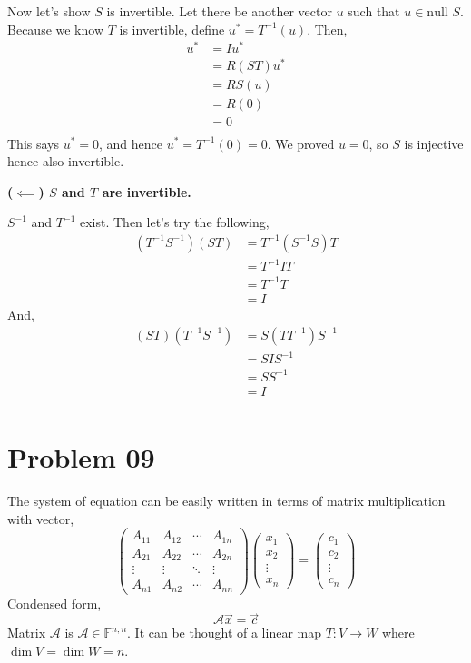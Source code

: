 \documentclass[letter]{article}
\begin{document}
Now let's show $S$ is invertible. Let there be another vector $u$ such that $u \in \text{null }S$. Because we know $T$ is invertible, define $u^{*} = T^{-1}(u)$. Then, 
\begin{align*}
	u^{*} &= I u^{*} \\ 
	&= R(ST)u^{*} \\
	&= RS(u) \\
	&= R(0) \\
	&= 0 \\
\end{align*}
This says $u^{*} = 0$, and hence $u^{*} = T^{-1}(0) = 0$. We proved $u=0$, so $S$ is injective hence also invertible. 

\textbf{
	($\impliedby$) $S$ and $T$ are invertible. 
}

$S^{-1}$ and $T^{-1}$ exist. Then let's try the following, 
\begin{align*}
	(T^{-1} S^{-1}) (ST) &= T^{-1} (S^{-1} S) T \\
	&= T^{-1} IT \\
	&= T^{-1} T \\
	&= I 
	\end{align*}
	And, 
	\begin{align*}
		(ST) (T^{-1} S^{-1}) &= S(T T^{-1})S^{-1}  \\ 
		&= S I S^{-1} \\
		&= S S^{-1} \\
		&= I \\
	\end{align*}


	\section*{Problem 09}
	The system of equation can be easily written in terms of matrix multiplication with vector, 
	\[
		\begin{pmatrix} A_{11} & A_{12} & \cdots & A_{1n} \\ 
			A_{21} & A_{22} & \cdots &A_{2n} \\ 
	\vdots & \vdots &\ddots & \vdots \\ 
A_{n1} & A_{n2} & \cdots & A_{n n }\end{pmatrix}  
\begin{pmatrix} x_1 \\ x_2 \\ \vdots \\ x_n \end{pmatrix}  = 
\begin{pmatrix} c_1 \\ c_2 \\ \vdots \\ c_n \end{pmatrix}  
	\]
	Condensed form, 
	\[
	\mathcal A \vec{x} = \vec{c}
	\] 
Matrix $\mathcal A$ is $\mathcal A \in \mathbb{F}^{n,n}$. It can be thought of a linear map $T: V\to W$ where $\dim V = \dim W = n$. 
\end{document}
